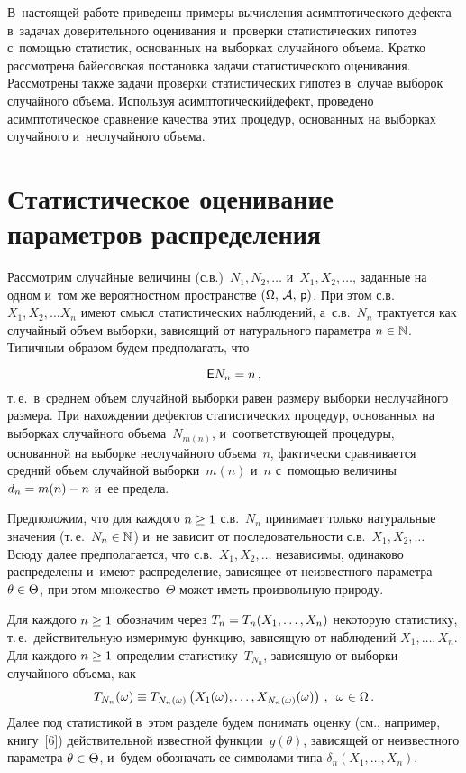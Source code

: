 \begin{multicols}{2}
В~настоящей работе приведены примеры вычисления асимптотического дефекта в~задачах 
доверительного оценивания и~проверки статистических гипотез с~помощью статистик, 
основанных на выборках случайного объема. Кратко рассмотрена байесовская постановка 
задачи статистического оценивания. Рассмотрены также задачи проверки статистических 
гипотез в~случае выборок случайного объема. Используя асимптотический\linebreak дефект, 
проведено асимптотическое сравнение качества этих процедур, основанных на 
выборках случайного и~неслучайного объема.


\section{Статистическое оценивание параметров распределения}

Рассмотрим случайные величины (с.в.)\ $N_1, N_2, \ldots$ и~$X_1, X_2, \ldots$, 
заданные на одном и~том же вероятностном 
пространстве $(\Omega,\,{\cal A},\,{\sf p})$. При этом с.в.\ 
$X_1, X_2, \ldots X_n$ имеют смысл статистических наблюдений, 
а~с.в.~$N_n$ трактуется как случайный объем выборки, зависящий от 
натурального параметра $n\hm\in \mathbb{N}$.
Типичным образом будем предполагать, что

\noindent
$$
{\sf E} N_n = n\,,
$$
т.\,е.\ в~среднем объем случайной выборки равен размеру выборки неслучайного размера. 
При на\-хож\-де\-нии дефектов статистических процедур, основанных на выборках случайного 
объема~$N_{m(n)}$, и~соответст\-ву\-ющей процедуры, основанной на выборке неслучайного 
объема~$n$, фактически сравнивается средний объем случайной выборки~$m(n)$ и~$n$ 
с~помощью величины $d_n\hm = m(n)\hm - n$ и~ее предела.

Предположим, что для каждого $n\hm\geq1$ с.в.~$N_n$ принимает только 
натуральные значения (т.\,е.\ $N_n \hm\in \mathbb{N}$) и~не зависит от 
последовательности с.в.\ $X_1, X_2, \ldots$ Всюду далее предполагается, что с.в.\
$X_1, X_2, \ldots$ независимы, одинаково распределены и~имеют распределение, 
зависящее от неизвестного параметра $\theta\hm \in \Theta$, при этом множество~$\Theta$ 
может иметь произвольную природу.

Для каждого $n\hm\geq1$ обозначим через $T_n\hm=T_n(X_1,\ldots,X_n)$ некоторую 
статистику, т.\,е.\ действительную измеримую функцию, зависящую от 
наблюдений $X_1,\ldots,X_n$. Для каждого $n\hm\geq1$ определим статистику~$T_{N_n}$, 
зависящую от выборки случайного объема, как
$$
T_{N_n}(\omega) \equiv T_{N_n(\omega)}\left(X_1(\omega),\ldots,X_{N_n(\omega)}(\omega)\right)\,,\enskip
\omega \in \Omega\,.
$$
Далее под статистикой в~этом разделе будем понимать оценку 
(см., например, книгу~[6]) действительной известной 
функции~$g(\theta)$, зависящей от неизвестного параметра $\theta\hm \in \Theta$, 
и~будем обозначать ее символами типа $\delta_n(X_1,\ldots,X_n)$.


\end{multicols}
